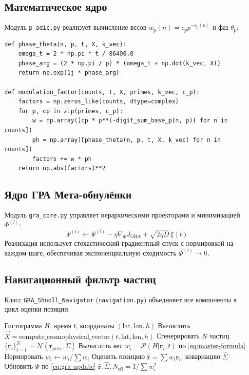 \documentclass[12pt,a4paper]{article}
\newcommand{\GRA}{\text{GRA}}
\newcommand{\vX}{\vec{X}}
\theoremstyle{plain}
\theoremstyle{definition}
\begin{document}
\subsection{Математическое ядро}
Модуль \texttt{p\_adic.py} реализует вычисление весов $w_p(n) = c_p p^{-s_p(n)}$ и фаз $\theta_p$:
\begin{lstlisting}[caption={Фрагмент p_adic.py: вычисление фазы и модуляции}, label={lst:padic}]
def phase_theta(n, p, t, X, k_vec):
    omega_t = 2 * np.pi * t / 86400.0
    phase_arg = (2 * np.pi / p) * (omega_t + np.dot(k_vec, X))
    return np.exp(1j * phase_arg)

def modulation_factor(counts, t, X, primes, k_vec, c_p):
    factors = np.zeros_like(counts, dtype=complex)
    for p, cp in zip(primes, c_p):
        w = np.array([cp * p**(-digit_sum_base_p(n, p)) for n in counts])
        ph = np.array([phase_theta(n, p, t, X, k_vec) for n in counts])
        factors += w * ph
    return np.abs(factors)**2
\end{lstlisting}

\subsection{Ядро ГРА Мета-обнулёнки}
Модуль \texttt{gra\_core.py} управляет иерархическими проекторами и минимизацией $\Phi^{(l)}$:
\begin{equation}
\Psi^{(l)} \leftarrow \Psi^{(l)} - \eta \nabla_{\Psi} J_{\GRA} + \sqrt{2\eta D}\,\xi(t)
\label{eq:gra-update}
\end{equation}
Реализация использует стохастический градиентный спуск с нормировкой на каждом шаге, обеспечивая экспоненциальную сходимость $\Phi^{(l)} \to 0$.

\subsection{Навигационный фильтр частиц}
Класс \texttt{GRA\_Shnoll\_Navigator} (\texttt{navigation.py}) объединяет все компоненты в цикл оценки позиции:
\begin{algorithm}[H]
\caption{Шаг навигации ГРА-Шноль}
\label{alg:navigation-step}
\begin{algorithmic}[1]
\Require Гистограмма $H$, время $t$, координаты $(\text{lat}, \text{lon}, h)$
\State Вычислить $\vX = \text{compute\_cosmophysical\_vector}(t, \text{lat}, \text{lon}, h)$
\State Сгенерировать $N$ частиц $\{\mathbf{r}_i\}_{i=1}^N \sim \mathcal{N}(\mathbf{r}_{\text{prev}}, \Sigma)$
    \State Вычислить вес $w_i = \mathcal{P}(H | \mathbf{r}_i, t)$ по \eqref{eq:master-formula}
\EndFor
\State Нормировать $w_i \leftarrow w_i / \sum w_i$
\State Оценить позицию $\hat{\mathbf{r}} = \sum w_i \mathbf{r}_i$, ковариацию $\hat{\Sigma}$
\State Обновить $\Psi$ по \eqref{eq:gra-update}
\State \Return $\hat{\mathbf{r}}, \hat{\Sigma}, N_{\text{eff}} = 1/\sum w_i^2$
\end{algorithmic}
\end{algorithm}
\end{document}
